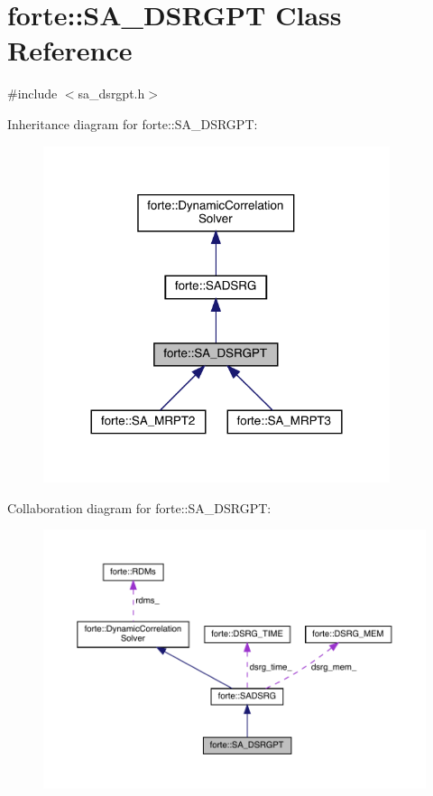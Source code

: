 \hypertarget{classforte_1_1_s_a___d_s_r_g_p_t}{}\section{forte\+:\+:S\+A\+\_\+\+D\+S\+R\+G\+PT Class Reference}
\label{classforte_1_1_s_a___d_s_r_g_p_t}


{\ttfamily \#include $<$sa\+\_\+dsrgpt.\+h$>$}



Inheritance diagram for forte\+:\+:S\+A\+\_\+\+D\+S\+R\+G\+PT\+:
\nopagebreak
\begin{figure}[H]
\begin{center}
\leavevmode
\includegraphics[width=288pt]{classforte_1_1_s_a___d_s_r_g_p_t__inherit__graph}
\end{center}
\end{figure}


Collaboration diagram for forte\+:\+:S\+A\+\_\+\+D\+S\+R\+G\+PT\+:
\nopagebreak
\begin{figure}[H]
\begin{center}
\leavevmode
\includegraphics[width=350pt]{classforte_1_1_s_a___d_s_r_g_p_t__coll__graph}
\end{center}
\end{figure}
